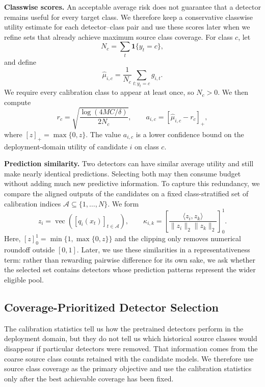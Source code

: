 \documentclass[conference]{IEEEtran}
\theoremstyle{definition}
\newcommand{\bheading}[1]{\noindent\textbf{#1.}\xspace}
\begin{document}
\bheading{Classwise scores}
An acceptable average risk does not guarantee that a detector remains useful for every target class.
We therefore keep a conservative classwise utility estimate for each detector--class pair and use these scores later when we refine sets that already achieve maximum source class coverage.
For class $c$, let
\begin{equation}
N_c=\sum_t\mathbf 1\{y_t=c\},
\end{equation}
and define
\begin{equation}
\widehat\mu_{i,c}=\frac1{N_c}\sum_{t:y_t=c}g_{i,t}.
\end{equation}
We require every calibration class to appear at least once, so $N_c>0$.
We then compute
\begin{equation}
r_c=\sqrt{\frac{\log(4MC/\delta)}{2N_c}},
\qquad
a_{i,c}=\left[\widehat\mu_{i,c}-r_c\right]_+,
\label{eq:class_lower_utility}
\end{equation}
where $[z]_+=\max\{0,z\}$.
The value $a_{i,c}$ is a lower confidence bound on the deployment-domain utility of candidate $i$ on class $c$.

\bheading{Prediction similarity}
Two detectors can have similar average utility and still make nearly identical predictions.
Selecting both may then consume budget without adding much new predictive information.
To capture this redundancy, we compare the aligned outputs of the candidates on a fixed class-stratified set of calibration indices $\mathcal A\subseteq\{1,\ldots,N\}$.
We form
\begin{equation}
z_i=\operatorname{vec}\left([q_i(x_t)]_{t\in\mathcal A}\right),
\qquad
\kappa_{i,k}=\left[
\frac{\langle z_i,z_k\rangle}{\|z_i\|_2\|z_k\|_2}
\right]_{0}^{1}.
\label{eq:behavior_similarity}
\end{equation}
Here, $[z]_0^1=\min\{1,\max\{0,z\}\}$ and the clipping only removes numerical roundoff outside $[0,1]$.
Later, we use these similarities in a representativeness term: rather than rewarding pairwise difference for its own sake, we ask whether the selected set contains detectors whose prediction patterns represent the wider eligible pool.

\subsection{Coverage-Prioritized Detector Selection}

The calibration statistics tell us how the pretrained detectors perform in the deployment domain, but they do not tell us which historical source classes would disappear if particular detectors were removed.
That information comes from the coarse source class counts retained with the candidate models.
We therefore use source class coverage as the primary objective and use the calibration statistics only after the best achievable coverage has been fixed.
\end{document}
